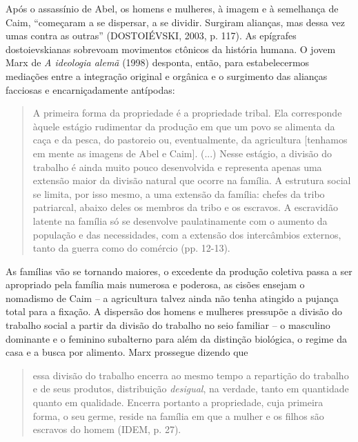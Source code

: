 Após o assassínio de Abel, os homens e mulheres, à imagem e à semelhança
de Caim, ``começaram a se dispersar, a se dividir. Surgiram alianças,
mas dessa vez umas contra as outras'' (DOSTOIÉVSKI, 2003, p. 117). As
epígrafes dostoievskianas sobrevoam movimentos ctônicos da história
humana. O jovem Marx de \emph{A ideologia alemã} (1998) desponta, então,
para estabelecermos mediações entre a integração original e orgânica e o
surgimento das alianças facciosas e encarniçadamente antípodas:

\begin{quote}
A primeira forma da propriedade é a propriedade tribal. Ela corresponde
àquele estágio rudimentar da produção em que um povo se alimenta da caça
e da pesca, do pastoreio ou, eventualmente, da agricultura {[}tenhamos
em mente as imagens de Abel e Caim{]}. (...) Nesse estágio, a divisão do
trabalho é ainda muito pouco desenvolvida e representa apenas uma
extensão maior da divisão natural que ocorre na família. A estrutura
social se limita, por isso mesmo, a uma extensão da família: chefes da
tribo patriarcal, abaixo deles os membros da tribo e os escravos. A
escravidão latente na família só se desenvolve paulatinamente com o
aumento da população e das necessidades, com a extensão dos intercâmbios
externos, tanto da guerra como do comércio (pp. 12-13).
\end{quote}

As famílias vão se tornando maiores, o excedente da produção coletiva
passa a ser apropriado pela família mais numerosa e poderosa, as cisões
ensejam o nomadismo de Caim -- a agricultura talvez ainda não tenha
atingido a pujança total para a fixação. A dispersão dos homens e
mulheres pressupõe a divisão do trabalho social a partir da divisão do
trabalho no seio familiar -- o masculino dominante e o feminino
subalterno para além da distinção biológica, o regime da casa e a busca
por alimento. Marx prossegue dizendo que

\begin{quote}
essa divisão do trabalho encerra ao mesmo tempo a repartição do trabalho
e de seus produtos, distribuição \emph{desigual}, na verdade, tanto em
quantidade quanto em qualidade. Encerra portanto a propriedade, cuja
primeira forma, o seu germe, reside na família em que a mulher e os
filhos são escravos do homem (IDEM, p. 27).
\end{quote}

